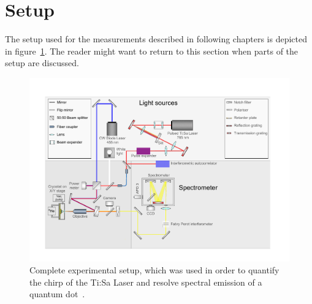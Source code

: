 \section{Setup}

The setup used for the measurements described in following chapters is depicted in figure~\ref{fig:setupflat}.
The reader might want to return to this section when parts of the setup are discussed.

\begin{figure}[H]
	\centering
	\includegraphics[width=1.1\linewidth]{figures/setup/Setup_flat}
	\caption[Complete experimental setup]{Complete experimental setup, which was used in order to quantify the chirp of the Ti:Sa Laser and resolve spectral emission of a quantum dot~\cite{schimpf_towards_2017}.}
	\label{fig:setupflat}
\end{figure}
